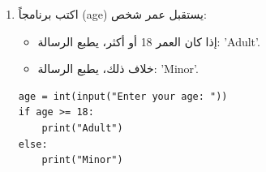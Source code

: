 \documentclass[14pt]{extarticle}
\begin{document}
\begin{enumerate}[itemsep=3em]
\item
اكتب برنامجاً (\textenglish{age}) يستقبل عمر شخص:
\begin{itemize}
    \item إذا كان العمر 18 أو أكثر، يطبع الرسالة: '\textenglish{Adult}'.
    \item خلاف ذلك، يطبع الرسالة: '\textenglish{Minor}'.
\end{itemize}

\ifwithsols
\begin{boxSolution}
\begin{english}
\begin{verbatim}
age = int(input("Enter your age: "))
if age >= 18:
    print("Adult")
else:
    print("Minor")
\end{verbatim}
\end{english}
\end{boxSolution}
\fi

\end{enumerate}
\clearpage
\end{document}
